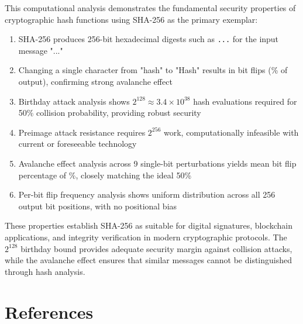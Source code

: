 \documentclass[a4paper, 11pt]{article}
\begin{document}
This computational analysis demonstrates the fundamental security properties of cryptographic
hash functions using SHA-256 as the primary exemplar:

\begin{enumerate}
\item SHA-256 produces 256-bit hexadecimal digests such as \texttt{...}
for the input message "..."

\item Changing a single character from "hash" to "Hash" results in 
bit flips (\% of output), confirming strong avalanche effect

\item Birthday attack analysis shows $2^{128} \approx 3.4 \times 10^{38}$ hash evaluations
required for 50\% collision probability, providing robust security

\item Preimage attack resistance requires $2^{256}$ work, computationally infeasible
with current or foreseeable technology

\item Avalanche effect analysis across 9 single-bit perturbations yields mean bit flip
percentage of \%, closely matching the ideal 50\%

\item Per-bit flip frequency analysis shows uniform distribution across all 256 output
bit positions, with no positional bias
\end{enumerate}

These properties establish SHA-256 as suitable for digital signatures, blockchain applications,
and integrity verification in modern cryptographic protocols. The $2^{128}$ birthday bound
provides adequate security margin against collision attacks, while the avalanche effect
ensures that similar messages cannot be distinguished through hash analysis.

\section*{References}
\end{document}
